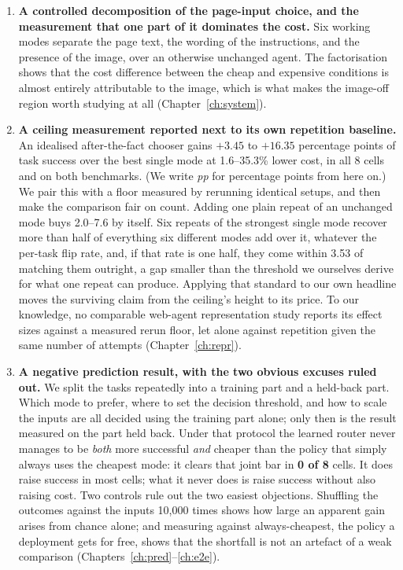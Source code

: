 \begin{enumerate}[leftmargin=1.5em]
\item \textbf{A controlled decomposition of the page-input choice, and the
measurement that one part of it dominates the cost.} Six working modes
separate the page text, the wording of the instructions, and the presence of
the image, over an otherwise unchanged agent. The factorisation shows that the cost difference between the
      cheap and expensive conditions is almost entirely attributable to the
      image, which is what makes the image-off region worth studying at all
      (Chapter~\ref{ch:system}).

\item \textbf{A ceiling measurement reported next to its own repetition
      baseline.} An idealised after-the-fact chooser gains $+3.45$ to $+16.35$
      percentage points of task success over the best single mode at
      1.6--35.3\% lower cost, in all 8 cells and on both benchmarks. (We write
      \emph{pp} for percentage points from here on.) We pair this with a floor
      measured by rerunning identical setups, and then make the comparison
      fair on count. Adding one plain repeat of an unchanged mode buys
      2.0--7.6\pp{} by itself. Six repeats of the strongest single mode recover
      more than half of everything six different modes add over it, whatever
      the per-task flip rate, and, if that rate is one half, they come within
      3.53\pp{} of matching them outright, a gap smaller than the threshold we
      ourselves derive for what one repeat can produce. Applying that
      standard to our own headline moves the surviving claim from the ceiling's
      height to its price. To our knowledge, no comparable web-agent
      representation study reports its effect sizes against a measured rerun
      floor, let alone against repetition given the same number of attempts
      (Chapter~\ref{ch:repr}).

\item \textbf{A negative prediction result, with the two obvious excuses ruled
out.} We split the tasks repeatedly into a training part and a held-back part.
Which mode to prefer, where to set the decision threshold, and how to scale
the inputs are all decided using the training part alone; only then is the
result measured on the part held back. Under that protocol the learned router
never manages to be \emph{both} more successful \emph{and} cheaper than the
policy that simply always uses the cheapest mode: it clears that joint bar in
\textbf{0 of 8} cells. It does raise success in most cells; what it never does
is raise success without also raising cost. Two controls rule out the
two easiest objections. Shuffling the outcomes against the inputs 10,000 times
shows how large an apparent gain arises from chance alone; and measuring
against always-cheapest, the policy a deployment gets for free, shows that the
shortfall is not an artefact of a weak comparison (Chapters~\ref{ch:pred}--\ref{ch:e2e}).


\end{enumerate}

